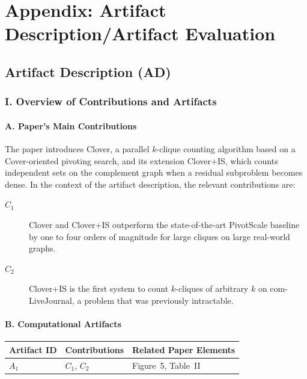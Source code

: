 
\section*{Appendix: Artifact Description/Artifact Evaluation}

\subsection*{Artifact Description (AD)}

\subsubsection*{I. Overview of Contributions and Artifacts}

\paragraph{A. Paper's Main Contributions}
The paper introduces \textsf{Clover}, a parallel $k$-clique counting
algorithm based on a Cover-oriented pivoting search, and its extension
\textsf{Clover+IS}, which counts independent sets on the complement graph
when a residual subproblem becomes dense. In the context of the artifact
description, the relevant contributions are:

\begin{description}
    \item[$C_1$] \textsf{Clover} and \textsf{Clover+IS} outperform the
    state-of-the-art \textsf{PivotScale} baseline by one to four orders of
    magnitude for large cliques on large real-world graphs.
    \item[$C_2$] \textsf{Clover+IS} is the first system to count
    $k$-cliques of arbitrary $k$ on \textsf{com-LiveJournal}, a problem
    that was previously intractable.
\end{description}

\paragraph{B. Computational Artifacts}
\begin{center}
\begin{tabular}{lll}
\toprule
Artifact ID & Contributions & Related Paper Elements \\
\midrule
$A_1$ & $C_1$, $C_2$ & Figure~5, Table~II \\
\bottomrule
\end{tabular}
\end{center}

